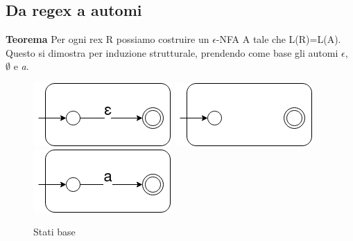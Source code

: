 \documentclass[12pt]{article}
\begin{document}
	\newpage
	\subsection{Da regex a automi}
	\textbf{Teorema} Per ogni rex R possiamo costruire un $\epsilon$-NFA A tale che L(R)=L(A).
	\\ Questo si dimostra per induzione strutturale, prendendo come base gli automi $\epsilon$, $\emptyset$ e \emph{a}.

	\begin{figure}[ht]
		\includegraphics[scale = 0.5]{media/epsilon.png}
		\includegraphics[scale = 0.5]{media/empty.png}
		\includegraphics[scale = 0.5]{media/simple_a.png}
		\centering
		\caption{Stati base}
	\end{figure}
\end{document}
